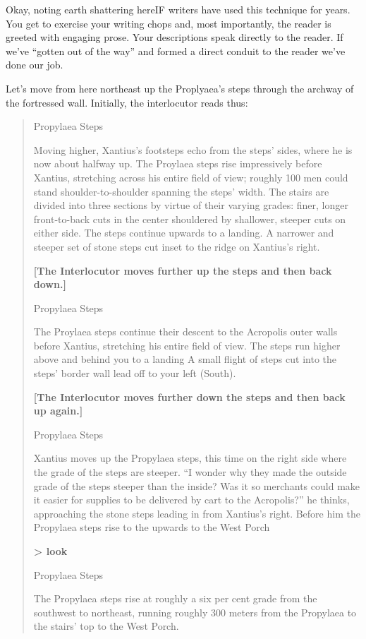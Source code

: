 \noindent Okay, noting earth shattering here\textendash IF writers have used this
technique for years. You get to exercise your writing chops and, most
importantly, the reader is greeted with engaging prose. Your
descriptions speak directly to the reader. If we've ``gotten out of the way''
and formed a direct conduit to the reader we've done our job.

Let's move from here northeast up the Proplyaea's steps through the archway of
the fortressed wall. Initially, the interlocutor reads thus:

\begin{quote}
  \small{
Propylaea Steps

Moving higher, Xantius's footsteps echo from the steps' sides, where he is now about halfway up.  The Proylaea steps rise impressively before
Xantius, stretching across his entire field of view; roughly 100 men could stand shoulder-to-shoulder spanning the steps' width.  The stairs are
divided into three sections by virtue of their varying grades: finer, longer front-to-back cuts in the center shouldered by shallower, steeper
cuts on either side.  The steps continue upwards to a landing.  A narrower and steeper set of stone steps cut inset to the ridge on Xantius's
right.

\textbf{[The Interlocutor moves further up the steps and then back down.]}

Propylaea Steps

The Proylaea steps continue their descent to the Acropolis outer walls before Xantius, stretching his entire field of view.  The steps run higher
above and behind you to a landing A small flight of steps cut into the steps' border wall lead off to your left (South).

\textbf{[The Interlocutor moves further down the steps and then back up again.]}

Propylaea Steps

Xantius moves up the Propylaea steps, this time on the right side where the grade of the steps are steeper.  ``I wonder why they made the outside
grade of the steps steeper than the inside?  Was it so merchants could make it easier for supplies to be delivered by cart to the Acropolis?'' he
thinks, approaching the stone steps leading in from Xantius's right.  Before him the Propylaea steps rise to the upwards to the West Porch

\textbf{> look}

Propylaea Steps

The Propylaea steps rise at roughly a six per cent grade from the southwest to northeast, running roughly 300 meters from the Propylaea to the
stairs' top to the West Porch.

  }
\end{quote}
  

